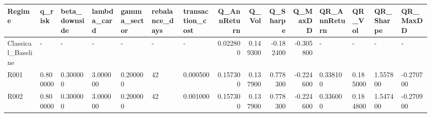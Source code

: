 \begin{tabular}{lllllllrrrrllll}
\toprule
Regime & q_risk & beta_downside & lambda_card & gamma_sector & rebalance_days & transaction_cost & Q_AnnReturn & Q_Vol & Q_Sharpe & Q_MaxDD & QR_AnnReturn & QR_Vol & QR_Sharpe & QR_MaxDD \\
\midrule
Classical_Baseline & - & - & - & - & - & - & 0.022800 & 0.149300 & -0.182400 & -0.305800 & - & - & - & - \\
R001 & 0.800000 & 0.300000 & 3.000000 & 0.200000 & 42 & 0.000500 & 0.157300 & 0.137900 & 0.778300 & -0.224600 & 0.338100 & 0.185000 & 1.557800 & -0.270700 \\
R002 & 0.800000 & 0.300000 & 3.000000 & 0.200000 & 42 & 0.001000 & 0.157300 & 0.137900 & 0.778300 & -0.224600 & 0.336000 & 0.184800 & 1.547400 & -0.270900 \\
\bottomrule
\end{tabular}
